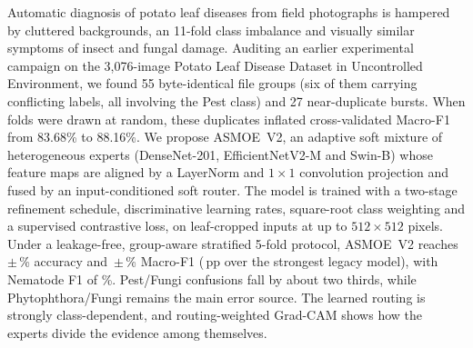 Automatic diagnosis of potato leaf diseases from field photographs is hampered by cluttered
backgrounds, an 11-fold class imbalance and visually similar symptoms of insect and fungal damage.
Auditing an earlier experimental campaign on the 3{,}076-image Potato Leaf Disease Dataset in
Uncontrolled Environment, we found 55 byte-identical file groups (six of them carrying conflicting
labels, all involving the Pest class) and 27 near-duplicate bursts. When folds were drawn at random,
these duplicates inflated cross-validated Macro-F1 from 83.68\% to 88.16\%.
We propose ASMOE~V2, an adaptive soft mixture of heterogeneous experts (DenseNet-201,
EfficientNetV2-M and Swin-B) whose feature maps are aligned by a LayerNorm and $1\times1$
convolution projection and fused by an input-conditioned soft router. The model is trained with a
two-stage refinement schedule, discriminative learning rates, square-root class weighting and a
supervised contrastive loss, on leaf-cropped inputs at up to $512\times512$ pixels.
Under a leakage-free, group-aware stratified 5-fold protocol, ASMOE~V2 reaches
\VtwoAcc\,$\pm$\,\VtwoAccSD\% accuracy and \VtwoFOne\,$\pm$\,\VtwoFOneSD\% Macro-F1
(\DeltaFOne\,pp over the strongest legacy model), with Nematode F1 of \VtwoFOneNematode\%.
Pest/Fungi confusions fall by about two thirds, while Phytophthora/Fungi remains the main error
source. The learned routing is strongly class-dependent, and routing-weighted Grad-CAM shows how
the experts divide the evidence among themselves.
